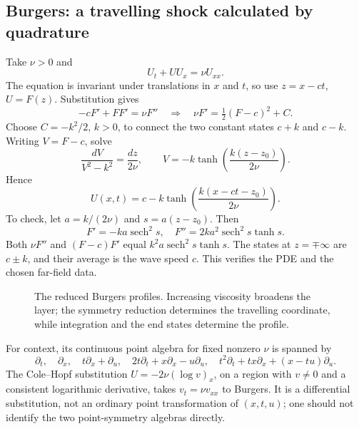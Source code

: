\documentclass[11pt,a4paper]{article}
\numberwithin{equation}{section}
\theoremstyle{definition}
\theoremstyle{plain}
\theoremstyle{remark}
\begin{document}
\subsection{Burgers: a travelling shock calculated by quadrature}
Take $\nu>0$ and
\[
U_t+UU_x=\nu U_{xx}.
\]
The equation is invariant under translations in $x$ and $t$, so use $z=x-ct$, $U=F(z)$. Substitution gives
\[
-cF'+FF'=\nu F''\quad\Longrightarrow\quad
\nu F'=\tfrac12(F-c)^2+C.
\]
Choose $C=-k^2/2$, $k>0$, to connect the two constant states $c+k$ and $c-k$. Writing $V=F-c$, solve
\[
\frac{dV}{V^2-k^2}=\frac{dz}{2\nu},\qquad
V=-k\tanh\left(\frac{k(z-z_0)}{2\nu}\right).
\]
Hence
\begin{equation}\label{eq:burgers-shock}
\boxed{U(x,t)=c-k\tanh\left(\frac{k(x-ct-z_0)}{2\nu}\right).}
\end{equation}
To check, let $a=k/(2\nu)$ and $s=a(z-z_0)$. Then
\[
F'=-ka\operatorname{sech}^2s,\quad
F''=2ka^2\operatorname{sech}^2s\tanh s.
\]
Both $\nu F''$ and $(F-c)F'$ equal $k^2a\operatorname{sech}^2s\tanh s$. The states at $z=\mp\infty$ are $c\pm k$, and their average is the wave speed $c$. This verifies the PDE and the chosen far-field data.

\begin{figure}[htbp]\centering
{}
\caption{The reduced Burgers profiles. Increasing viscosity broadens the layer; the symmetry reduction determines the travelling coordinate, while integration and the end states determine the profile.}
\end{figure}

For context, its continuous point algebra for fixed nonzero $\nu$ is spanned by
\[
\partial_t,\quad\partial_x,\quad t\partial_x+\partial_u,\quad
2t\partial_t+x\partial_x-u\partial_u,\quad
 t^2\partial_t+tx\partial_x+(x-tu)\partial_u.
\]
The Cole--Hopf substitution $U=-2\nu(\log v)_x$, on a region with $v\ne0$ and a consistent logarithmic derivative, takes $v_t=\nu v_{xx}$ to Burgers. It is a differential substitution, not an ordinary point transformation of $(x,t,u)$; one should not identify the two point-symmetry algebras directly.
\end{document}
